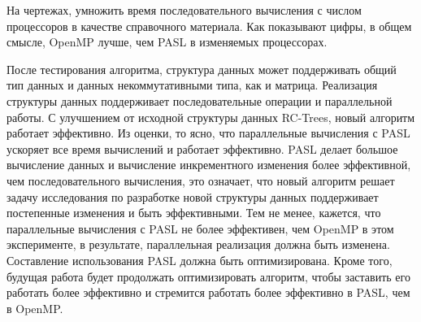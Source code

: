 \documentclass[specification,annotation,times]{itmo-student-thesis}
\newcommand{\revise}[1]{{\color{red!70!black} #1 }}
\begin{document}
\revise{
На чертежах, умножить время последовательного вычисления с числом процессоров в качестве справочного материала. Как показывают цифры, в общем смысле, OpenMP лучше, чем PASL в изменяемых процессорах.
}

\chapterconclusion

\startconclusionpage

\revise{
После тестирования алгоритма, структура данных может поддерживать общий тип данных и данных некоммутативными типа, как и матрица. Реализация структуры данных поддерживает последовательные операции и 
параллельной работы. С улучшением от исходной структуры данных RC-Trees, новый алгоритм работает эффективно. Из оценки, то ясно, что параллельные вычисления с PASL ускоряет все время вычислений и работает 
эффективно. PASL делает большое вычисление данных и вычисление инкрементного изменения более эффективной, чем последовательного вычисления, это означает, что новый алгоритм решает задачу исследования по 
разработке новой структуры данных поддерживает постепенные изменения и быть эффективными. Тем не менее, кажется, что параллельные вычисления с PASL не более эффективен, чем OpenMP в этом эксперименте, в 
результате, параллельная реализация должна быть изменена. Составление использования PASL должна быть оптимизирована. Кроме того, будущая работа будет продолжать оптимизировать алгоритм, чтобы заставить 
его работать более эффективно и стремится работать более эффективно в PASL, чем в OpenMP.
}

\printmainbibliography
\end{document}
